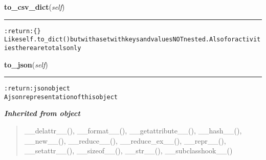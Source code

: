     \vspace{0.5ex}

\hspace{.8\funcindent}\begin{boxedminipage}{\funcwidth}

    \raggedright \textbf{to\_csv\_dict}(\textit{self})

    \vspace{-1.5ex}

    \rule{\textwidth}{0.5\fboxrule}
\setlength{\parskip}{2ex}
\begin{alltt}

:return: \{\}
    Like self.to\_dict() but with a set with keys and values NOT nested. Also for activities there are totals only
\end{alltt}

\setlength{\parskip}{1ex}
    \end{boxedminipage}

    \label{pygce:models:garmin:timeline:GCDayTimeline:to_json}

    \vspace{0.5ex}

\hspace{.8\funcindent}\begin{boxedminipage}{\funcwidth}

    \raggedright \textbf{to\_json}(\textit{self})

    \vspace{-1.5ex}

    \rule{\textwidth}{0.5\fboxrule}
\setlength{\parskip}{2ex}
\begin{alltt}

:return: json object
    A json representation of this object
\end{alltt}

\setlength{\parskip}{1ex}
    \end{boxedminipage}


\large{\textbf{\textit{Inherited from object}}}

\begin{quote}
\_\_delattr\_\_(), \_\_format\_\_(), \_\_getattribute\_\_(), \_\_hash\_\_(), \_\_new\_\_(), \_\_reduce\_\_(), \_\_reduce\_ex\_\_(), \_\_repr\_\_(), \_\_setattr\_\_(), \_\_sizeof\_\_(), \_\_str\_\_(), \_\_subclasshook\_\_()
\end{quote}


